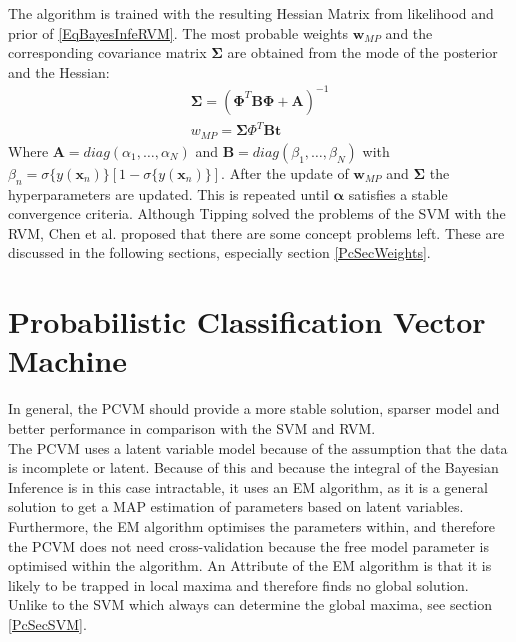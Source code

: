 The algorithm is trained with the resulting Hessian Matrix from likelihood and prior of \ref{EqBayesInfeRVM}.
The most probable weights $\mathbf{w}_{MP}$ and the corresponding covariance matrix $\boldsymbol{\Sigma}$ are obtained from the mode of the posterior and the Hessian:
\begin{equation}
\begin{split}
\boldsymbol{\Sigma} = (\boldsymbol{\Phi}^T\mathbf{B}\boldsymbol{\Phi} + \mathbf{A})^{-1}\\
w_{MP}=\boldsymbol{\Sigma}\Phi^T\mathbf{B}\mathbf{t} 
\end{split}
\end{equation}
Where $\mathbf{A} = diag(\alpha_1,\dots,\alpha_N)$ and $\mathbf{B} = diag(\beta_1,\dots,\beta_N)$ with $\beta_n =\sigma\{y(\mathbf{x}_n)\}[1-\sigma\{y(\mathbf{x}_n)\}]$.
After the update of $\mathbf{w}_{MP}$ and $\boldsymbol{\Sigma}$ the hyperparameters are updated.
This is repeated until $\boldsymbol{\alpha}$ satisfies a stable convergence criteria.\cite[p. 219]{Tipping.2001}\newline
Although Tipping solved the problems of the \ac{SVM} with the \ac{RVM}, Chen et al. proposed that there are some concept problems left.\cite{Chen.2009}
These are discussed in the following sections, especially section \ref{PcSecWeights}.
\section{Probabilistic Classification Vector Machine}\label{PcSecAdvan}
In general, the \acf{PCVM} should provide a more stable solution, sparser model and better performance in comparison with the \acs{SVM} and \acs{RVM}.\cite{Chen.2009}\\
The \ac{PCVM} uses a latent variable model because of the assumption that the data is incomplete or latent.
Because of this and because the integral of the Bayesian Inference is in this case intractable, it uses an \ac{EM} algorithm, as it is a general solution to get a \ac{MAP} estimation of parameters based on latent variables.
Furthermore, the \acs{EM} algorithm optimises the parameters within, and therefore the \ac{PCVM} does not need cross-validation because the free model parameter is optimised within the algorithm.\cite{Chen.2009}\newline
An Attribute of the \acs{EM} algorithm is that it is likely to be trapped in local maxima and therefore finds no global solution.\cite{YiWang.2006}
Unlike to the \acs{SVM} which always can determine the global maxima, see section \ref{PcSecSVM}.\newline

